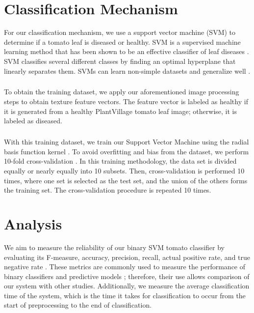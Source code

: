 \section{Classification  Mechanism}
For our classification mechanism, we use a support vector machine (SVM) \cite{vapnikNatureStatisticalLearning2000} to determine if a tomato leaf is diseased or healthy. SVM is a supervised machine learning method that has been shown to be an effective classifier of leaf diseases \cite{mokhtarSVMBasedDetectionTomato2015, kiranPlantLeafDisease2023, harakannanavarPlantLeafDisease2022, govardhanDiagnosisTomatoPlant2019}. SVM classifies several different classes by finding an optimal hyperplane that linearly separates them. SVMs can learn non-simple datasets and generalize well \cite{kiranPlantLeafDisease2023}.

\subparagraph{}
To obtain the training dataset, we apply our aforementioned image processing steps to obtain texture feature vectors. The feature vector is labeled as healthy if it is generated from a healthy PlantVillage tomato leaf image; otherwise, it is labeled as diseased.

\subparagraph{}
With this training dataset, we train our Support Vector Machine using the radial basis function kernel \cite{boolchandaniExploringEfficientKernel}. 
To avoid overfitting and bias from the dataset, we perform 10-fold cross-validation \cite{AdvancedDataMining2008}. In this training methodology, the data set is divided equally or nearly equally into 10 subsets. Then, cross-validation is performed 10 times, where one set is selected as the test set, and the union of the others forms the training set. The cross-validation procedure is repeated 10 times.

\section{Analysis}
We aim to measure the reliability of our binary SVM tomato classifier by evaluating its F-measure, accuracy, precision, recall, actual positive rate, and true negative rate \cite{AdvancedDataMining2008}. These metrics are commonly used to measure the performance of binary classifiers and predictive models \cite{lopez-garciaAutomaticDetectionSkin2010}; therefore, their use allows comparison of our system with other studies. Additionally, we measure the average classification time of the system, which is the time it takes for classification to occur from the start of preprocessing to the end of classification.

